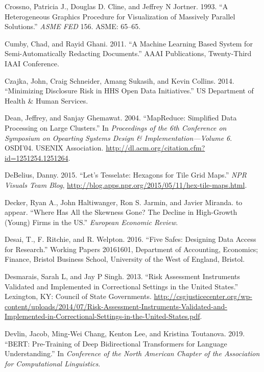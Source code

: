 \documentclass[]{krantz}
\begin{document}
\hypertarget{ref-crossno1993heterogeneous}{}
Crossno, Patricia J., Douglas D. Cline, and Jeffrey N Jortner. 1993. ``A
Heterogeneous Graphics Procedure for Visualization of Massively Parallel
Solutions.'' \emph{ASME FED} 156. ASME: 65--65.

\hypertarget{ref-Cumby2011}{}
Cumby, Chad, and Rayid Ghani. 2011. ``A Machine Learning Based System
for Semi-Automatically Redacting Documents.'' AAAI Publications,
Twenty-Third IAAI Conference.

\hypertarget{ref-czajka2014minimizing}{}
Czajka, John, Craig Schneider, Amang Sukasih, and Kevin Collins. 2014.
``Minimizing Disclosure Risk in HHS Open Data Initiatives.'' US
Department of Health \& Human Services.

\hypertarget{ref-MapReduce}{}
Dean, Jeffrey, and Sanjay Ghemawat. 2004. ``MapReduce: Simplified Data
Processing on Large Clusters.'' In \emph{Proceedings of the 6th
Conference on Symposium on Opearting Systems Design \&
Implementation---Volume 6}. OSDI'04. USENIX Association.
\url{http://dl.acm.org/citation.cfm?id=1251254.1251264}.

\hypertarget{ref-DeBelius2015}{}
DeBelius, Danny. 2015. ``Let's Tesselate: Hexagons for Tile Grid Maps.''
\emph{NPR Visuals Team Blog},
\url{http://blog.apps.npr.org/2015/05/11/hex-tile-maps.html}.

\hypertarget{ref-decker2015has}{}
Decker, Ryan A., John Haltiwanger, Ron S. Jarmin, and Javier Miranda. to
appear. ``Where Has All the Skewness Gone? The Decline in High-Growth
(Young) Firms in the US.'' \emph{European Economic Review}.

\hypertarget{ref-desaietal2016}{}
Desai, T., F. Ritchie, and R. Welpton. 2016. ``Five Safes: Designing
Data Access for Research.'' Working Papers 20161601, Department of
Accounting, Economics; Finance, Bristol Business School, University of
the West of England, Bristol.

\hypertarget{ref-desmarais2013}{}
Desmarais, Sarah L, and Jay P Singh. 2013. ``Risk Assessment Instruments
Validated and Implemented in Correctional Settings in the United
States.'' Lexington, KY: Council of State Governments.
\url{http://csgjusticecenter.org/wp-content/uploads/2014/07/Risk-Assessment-Instruments-Validated-and-Implemented-in-Correctional-Settings-in-the-United-States.pdf}.

\hypertarget{ref-devlin-18}{}
Devlin, Jacob, Ming-Wei Chang, Kenton Lee, and Kristina Toutanova. 2019.
``BERT: Pre-Training of Deep Bidirectional Transformers for Language
Understanding.'' In \emph{Conference of the North American Chapter of
the Association for Computational Linguistics}.
\end{document}
